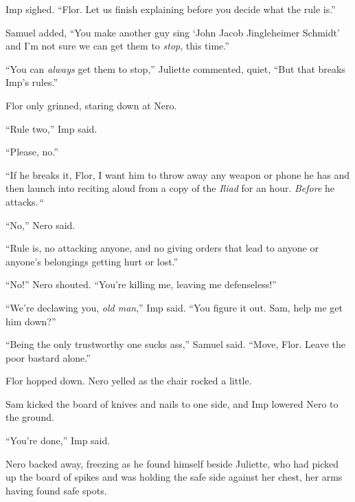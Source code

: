 Imp sighed.  ``Flor.  Let us finish explaining before you decide what the rule is.''



Samuel added, ``You make another guy sing `John Jacob Jingleheimer Schmidt' and I'm not sure we can get them to \emph{stop}, this time.''



``You can \emph{always} get them to stop,'' Juliette commented, quiet, ``But that breaks Imp's rules.''



Flor only grinned, staring down at Nero.



``Rule two,'' Imp said.



``Please, no.''



``If he breaks it, Flor, I want him to throw away any weapon or phone he has and then launch into reciting aloud from a copy of the \emph{Iliad }for an hour.  \emph{Before} he attacks.\emph{``}



``No,'' Nero said.



``Rule is, no attacking anyone, and no giving orders that lead to anyone or anyone's belongings getting hurt or lost.''



``No!'' Nero shouted.  ``You're killing me, leaving me defenseless!''



``We're declawing you, \emph{old man},'' Imp said.  ``You figure it out.  Sam, help me get him down?''



``Being the only trustworthy one sucks ass,'' Samuel said.  ``Move, Flor.  Leave the poor bastard alone.''



Flor hopped down.  Nero yelled as the chair rocked a little.



Sam kicked the board of knives and nails to one side, and Imp lowered Nero to the ground.



``You're done,'' Imp said.



Nero backed away, freezing as he found himself beside Juliette, who had picked up the board of spikes and was holding the safe side against her chest, her arms having found safe spots.



